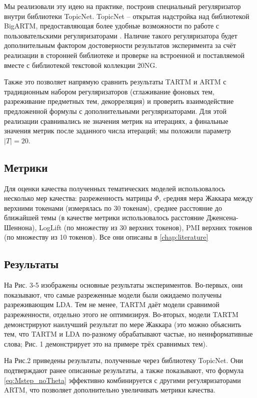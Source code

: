 Мы реализовали эту идею на практике, построив специальный регуляризатор внутри библиотеки TopicNet. TopicNet -- открытая надстройка над библиотекой BigARTM, предоставляющая более удобные возможности по работе с пользовательскими регуляризаторами  \cite{bulatov2020topicnet}. Наличие такого регуляризатора будет дополнительным фактором достоверности результатов эксперимента за счёт реализации в сторонней библиотеке и проверке на встроенной и поставляемой вместе с библиотекой текстовой коллекции 20NG. 

Также это позволяет напрямую сравнить результаты TARTM и ARTM с традиционным набором регуляризаторов (сглаживание фоновых тем, разреживание предметных тем, декорреляция) и проверить взаимодействие предложенной формулы с дополнительными регуляризаторами. Для этой реализации сравнивались не значения метрик на итерациях, а финальные значения метрик после заданного числа итераций; мы положили параметр $\mid T\mid = 20$.

\subsection{Метрики}

Для оценки качества полученных тематических моделей использовалось несколько мер качества: разреженность матрицы $\Phi$, cредняя мера Жаккара между верхними токенами (измерялась по 30 токенам), среднее расстояние до ближайшей темы (в качестве метрики использовалось расстояние Дженсена-Шеннона),  LogLift (по множеству из 30 верхних токенов), PMI верхних токенов (по множеству из 10 токенов). Все они описаны в \ref{chap:literature}

\subsection{Результаты}
На Рис. 3-5 изображены основные результаты экспериментов. Во-первых, они показывают, что  самые разреженные модели были ожидаемо получены разреживающим LDA. Тем не менее, TARTM даёт модели сравнимой разреженности, отдельно этого не оптимизируя. Во-вторых, модели TARTM демонстрируют наилучший результат по мере Жаккара (это можно объяснить тем, что TARTM и LDA по-разному обрабатывают  частые, но неинформативные слова; Рис. 1 демонстрирует это на примере трёх сравнимых тем).

На Рис.2 приведены результаты, полученные через библиотеку TopicNet. Они подтверждают ранее описанные результаты, а также показывают, что формула \ref{eq:Mstep_noTheta} эффективно комбинируется с другими регуляризаторами ARTM, что позволяет дополнительно увеличивать метрики качества.

